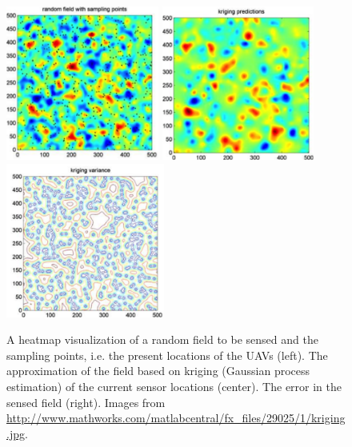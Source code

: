 \begin{figure}
\begin{center}
\includegraphics[height=2in]{kriginga.png} 
\includegraphics[height=2in]{krigingb.png} 
\includegraphics[height=2in]{krigingc.png} 
\end{center}
\caption{A heatmap visualization of a random field to be sensed and the sampling points, i.e. the present locations of the UAVs (left).
  The approximation of the field based on kriging (Gaussian process estimation) of the current sensor locations (center).  
  The error in the sensed field (right).
  Images from {\small \url{http://www.mathworks.com/matlabcentral/fx_files/29025/1/kriging.jpg}}.} 
\label{fig:krig}
\end{figure}

